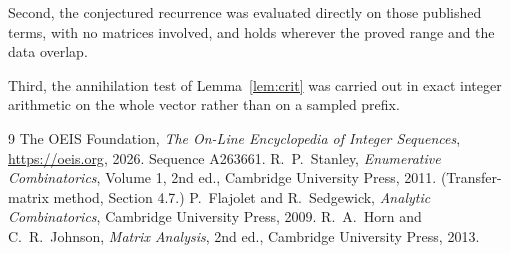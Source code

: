 \documentclass[11pt,a4paper]{article}
\theoremstyle{plain}
\theoremstyle{definition}
\begin{document}
Second, the conjectured recurrence was evaluated directly on those published terms, with no
matrices involved, and holds wherever the proved range and the data overlap.

Third, the annihilation test of Lemma~\ref{lem:crit} was carried out in exact integer
arithmetic on the whole vector rather than on a sampled prefix.

\begin{thebibliography}{9}
 The OEIS Foundation, \emph{The On-Line Encyclopedia of Integer
Sequences}, \url{https://oeis.org}, 2026. Sequence A263661.
 R.~P.~Stanley, \emph{Enumerative Combinatorics}, Volume 1, 2nd ed.,
Cambridge University Press, 2011. (Transfer-matrix method, Section 4.7.)
 P.~Flajolet and R.~Sedgewick, \emph{Analytic Combinatorics}, Cambridge
University Press, 2009.
 R.~A.~Horn and C.~R.~Johnson, \emph{Matrix Analysis}, 2nd ed., Cambridge
University Press, 2013.
\end{thebibliography}
\end{document}
